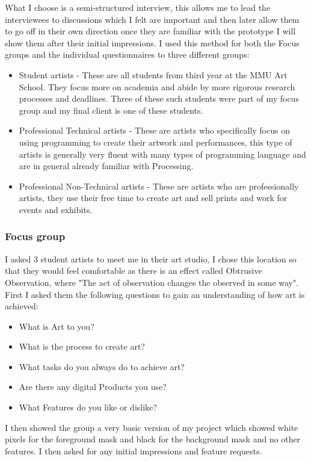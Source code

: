 \documentclass[a4paper]{report}
\begin{document}
What I choose is a semi-structured interview, this allows me to lead the interviewees to discussions which I felt are important and then later allow them to go off in their own direction once they are familiar with the prototype I will show them after their initial impressions. I used this method for both the Focus groups and the individual questionnaires to three different groups:

\begin{itemize}
\item Student artists - These are all students from third year at the MMU Art School. They focus more on academia and abide by more rigorous research processes and deadlines. Three of these such students were part of my focus group and my final client is one of these students.
\item Professional Technical artists - These are artists who specifically focus on using programming to create their artwork and performances, this type of artists is generally very fluent with many types of programming language and are in general already familiar with Processing\cite{PROCESSING}.
\item Professional Non-Technical artists - These are artists who are professionally artists, they use their free time to create art and sell prints and work for events and exhibits.
\end{itemize}

\subsubsection{Focus group}
I asked 3 student artists to meet me in their art studio, I chose this location so that they would feel comfortable as there is an effect called Obtrusive Observation, where "The act of observation changes the observed in some way"\cite{UX}. First I asked them the following questions to gain an understanding of how art is achieved:

\begin{itemize}
\item What is Art to you?
\item What is the process to create art?
\item What tasks do you always do to achieve art?
\item Are there any digital Products you use?
\item What Features do you like or dislike?
\end{itemize}

I then showed the group a very basic version of my project which showed white pixels for the foreground mask and black for the background mask and no other features. I then asked for any initial impressions and feature requests.
\end{document}
